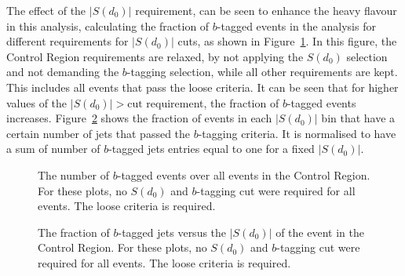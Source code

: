 
The effect of the $|S(d_0)|$ requirement, can be seen to enhance the heavy flavour in this analysis, calculating the fraction of $b$-tagged events in the analysis for different
requirements for $|S(d_0)|$ cuts, as shown in Figure~\ref{fig:sd0cut}. In this
figure, the Control Region requirements are relaxed, by not applying the $S(d_0)$
selection and not demanding the $b$-tagging selection, while all other requirements
are kept. This includes all events that pass the loose criteria. It can be seen that
for higher values of the $|S(d_0)| > \textrm{cut}$ requirement, the fraction of $b$-tagged
events increases. Figure~\ref{fig:sd0cut2d} shows the fraction of events in each $|S(d_0)|$ bin
that have a certain number of jets that passed the $b$-tagging criteria.
It is normalised to have a sum of number of $b$-tagged jets entries equal to 
one for a fixed $|S(d_0)|$.

\begin{figure}[H]
\centering
{}


\caption{The number of $b$-tagged events over all events in the Control Region. For these plots, no $S(d_0)$ and $b$-tagging cut were required for all events. The loose criteria is required.}
\label{fig:sd0cut}
\end{figure}

\begin{figure}[H]
\centering
{}


\caption{The fraction of $b$-tagged jets versus the $|S(d_0)|$ of the event in the Control Region. For these plots, no $S(d_0)$ and $b$-tagging cut were required for all events. The loose criteria is required.}
\label{fig:sd0cut2d}
\end{figure}

